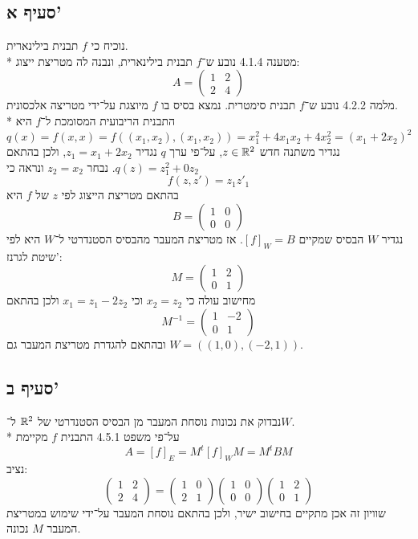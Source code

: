 \subsection{סעיף א'}
נוכיח כי $f$ תבנית בילינארית. \\*
מטענה 4.1.4 נובע ש־$f$ תבנית בילינארית, ונבנה לה מטריצת ייצוג:
\[
	A = \begin{pmatrix}
		1 & 2 \\
		2 & 4
	\end{pmatrix}
\]
מלמה 4.2.2 נובע ש־$f$ תבנית סימטרית.
נמצא בסיס בו $f$ מיוצגת על־ידי מטריצה אלכסונית. \\*
התבנית הריבועית המסומכת ל־$f$ היא
\[
	q(x) = f(x, x) = f((x_1, x_2), (x_1, x_2)) = x_1^2 + 4x_1 x_2 + 4 x_2^2 = {(x_1 + 2x_2)}^2
\]
נגדיר משתנה חדש $z \in \mathbb{R}^2$, על־פי ערך $q$ נגדיר $z_1 = x_1 + 2x_2$, ולכן בהתאם $q(z) = z_1^2 + 0z_2$.
נבחר $z_2 = x_2$ ונראה כי
\[
	f(z, z') = z_1 z'_1
\]
בהתאם מטריצת הייצוג לפי $z$ של $f$ היא
\[
	B = \begin{pmatrix}
		1 & 0 \\
		0 & 0
	\end{pmatrix}
\]
נגדיר $W$ הבסיס שמקיים ${[f]}_W = B$. אז מטריצת המעבר מהבסיס הסטנדרטי ל־$W$ היא לפי שיטת לגרנז':
\[
	M = \begin{pmatrix}
		1 & 2 \\
		0 & 1
	\end{pmatrix}
\]
מחישוב עולה כי $x_2 = z_2$ וכי $x_1 = z_1 - 2z_2$ ולכן בהתאם
\[
	M^{-1} = \begin{pmatrix}
		1 & -2 \\
		0 & 1
	\end{pmatrix}
\]
ובהתאם להגדרת מטריצת המעבר גם $W = ((1, 0), (-2, 1))$.

\subsection{סעיף ב'}
נבדוק את נכונות נוסחת המעבר מן הבסיס הסטנדרטי של $\mathbb{R}^2$ ל־$W$. \\*
על־פי משפט 4.5.1 התבנית $f$ מקיימת
\[
	A = {[f]}_E = M^t {[f]}_W M = M^t B M
\]
נציב:
\[
	\begin{pmatrix}
		1 & 2 \\
		2 & 4
	\end{pmatrix}
	=
	\begin{pmatrix}
		1 & 0 \\
		2 & 1
	\end{pmatrix}
	\begin{pmatrix}
		1 & 0 \\
		0 & 0
	\end{pmatrix}
	\begin{pmatrix}
		1 & 2 \\
		0 & 1
	\end{pmatrix}
\]
שוויון זה אכן מתקיים בחישוב ישיר, ולכן בהתאם נוסחת המעבר על־ידי שימוש במטריצת המעבר $M$ נכונה.

